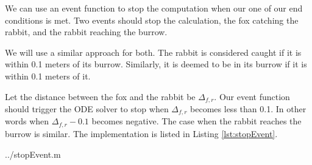 We can use an event function to stop the computation when our one of our end conditions is met. Two events should stop the calculation, the fox catching the rabbit, and the rabbit reaching the burrow.

We will use a similar approach for both. The rabbit is considered caught if it is within 0.1 meters of its burrow. Similarly, it is deemed to be in its burrow if it is within 0.1 meters of it.

Let the distance between the fox and the rabbit be $\Delta_{f,r}$. Our event function should trigger the ODE solver to stop when $\Delta_{f,r}$ becomes less than 0.1. In other words when $\Delta_{f,r} - 0.1$ becomes negative. The case when the rabbit reaches the burrow is similar. The implementation is listed in Listing \ref{lst:stopEvent}.

  {../stopEvent.m}

